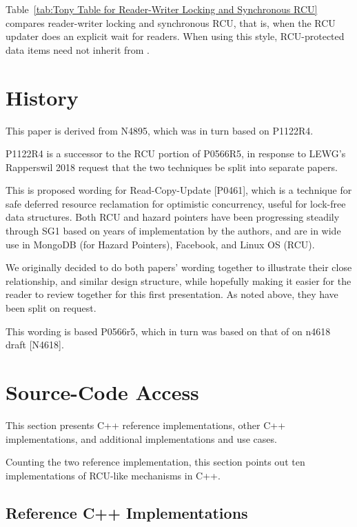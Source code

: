 Table~\ref{tab:Tony Table for Reader-Writer Locking and Synchronous RCU}
compares reader-writer locking and synchronous RCU, that is, when the
RCU updater does an explicit wait for readers.
When using this style, RCU-protected data items need not inherit from
.

\section{History}
\label{sec:History}

This paper is derived from N4895, which was in turn based on P1122R4.

P1122R4 is a successor to the RCU portion of P0566R5, in response to
LEWG’s Rapperswil 2018 request that the two techniques be split into
separate papers.

This is proposed wording for Read-Copy-Update [P0461], which is
a technique for safe deferred resource reclamation for optimistic
concurrency, useful for lock-free data structures.
Both RCU and hazard pointers have been progressing steadily through SG1
based on years of implementation by the authors, and are in wide use in
MongoDB (for Hazard Pointers), Facebook, and Linux OS (RCU).

We originally decided to do both papers' wording together to illustrate
their close relationship, and similar design structure, while hopefully
making it easier for the reader to review together for this first
presentation.
As noted above, they have been split on request.

This wording is based P0566r5, which in turn was based on that of on
n4618 draft [N4618].

\section{Source-Code Access}
\label{sec:Source-Code Access}

This section presents C++ reference implementations, other
C++ implementations, and additional implementations and use cases.

Counting the two reference implementation, this section points out
ten implementations of RCU-like mechanisms in C++.

\subsection{Reference C++ Implementations}
\label{sec:Reference C++ Implementations}

